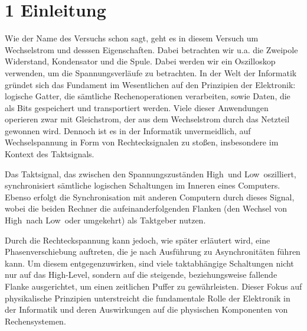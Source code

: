 \chapter*{1 Einleitung}
\setcounter{chapter}{1}
\setcounter{section}{0}
\setcounter{subsection}{0}

Wie der Name des Versuchs schon sagt, geht es in diesem Versuch um Wechselstrom und desssen Eigenschaften. Dabei betrachten wir u.a. die Zweipole Widerstand, Kondensator und die Spule. Dabei werden wir ein Oszilloskop verwenden, um die Spannungsverläufe zu betrachten.
In der Welt der Informatik gründet sich das Fundament im Wesentlichen auf den Prinzipien der Elektronik: logische Gatter, die sämtliche Rechenoperationen verarbeiten, sowie Daten, die als Bits gespeichert und transportiert werden. Viele dieser Anwendungen operieren zwar mit Gleichstrom, der aus dem Wechselstrom durch das Netzteil gewonnen wird. Dennoch ist es in der Informatik unvermeidlich, auf Wechselspannung in Form von Rechtecksignalen zu stoßen, insbesondere im Kontext des Taktsignals.

Das Taktsignal, das zwischen den Spannungszuständen \glqq High\grqq\ und \glqq Low\grqq\ oszilliert, synchronisiert sämtliche logischen Schaltungen im Inneren eines Computers. Ebenso erfolgt die Synchronisation mit anderen Computern durch dieses Signal, wobei die beiden Rechner die aufeinanderfolgenden Flanken (den Wechsel von \glqq High\grqq\ nach \glqq Low\grqq\ oder umgekehrt) als Taktgeber nutzen.

Durch die Rechteckspannung kann jedoch, wie später erläutert wird, eine Phasenverschiebung auftreten, die je nach Ausführung zu Asynchronitäten führen kann. Um diesem entgegenzuwirken, sind viele taktabhängige Schaltungen nicht nur auf das High-Level, sondern auf die steigende, beziehungsweise fallende Flanke ausgerichtet, um einen zeitlichen Puffer zu gewährleisten. Dieser Fokus auf physikalische Prinzipien unterstreicht die fundamentale Rolle der Elektronik in der Informatik und deren Auswirkungen auf die physischen Komponenten von Rechensystemen.